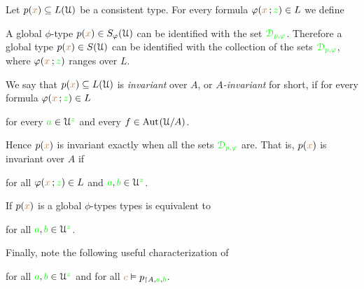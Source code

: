 Let $p({\color{brown} x})\subseteq L(\EuScript U)$ be a consistent type.
For every formula $\varphi({\color{brown} x}\,;{\color{green} z})\in L$ we define



A global $\phi$-type $p({\color{brown} x})\in S_\varphi(\EuScript U)$ can be identified with the set ${\color{green}\EuScript D_{p,\varphi}}$.
Therefore a global type $p({\color{brown} x})\in S(\EuScript U)$ can be identified with the collection of the sets ${\color{green}\EuScript D_{p,\varphi}}$, where $\varphi({\color{brown} x}\,;{\color{green} z})$ ranges over $L$.

We say that $p({\color{brown} x})\subseteq L(\EuScript U)$ is \emph{invariant\/} over $A$, or \emph{$A$-invariant\/} for short, if for every formula $\varphi({\color{brown} x}\,;{\color{green} z})\in L$ 

\hfill for every ${\color{green} a}\in\EuScript U^{\color{green} z}$ and every $f\in{\rm Aut\kern.15ex}(\EuScript U/A)$.

Hence $p({\color{brown} x})$ is invariant exactly when all the sets $\color{green}\EuScript D_{p,\varphi}$ are.
That is, $p({\color{brown} x})$ is invariant over $A$ if 

\hfill for all $\varphi({\color{brown} x}\,;{\color{green} z})\in L$ and ${\color{green} a},{\color{green} b}\in\EuScript U^{\color{green} z}$.


If $p({\color{brown} x})$ is a global $\phi$-types types  is equivalent to

\hfill for all ${\color{green} a},{\color{green} b}\in\EuScript U^{\color{green} z}$.

Finally, note the following useful characterization of 

\hfill for all ${\color{green} a},{\color{green} b}\in\EuScript U^{\color{green} z}$ and for all ${\color{brown} c}\vDash p_{\restriction A,{\color{green} a},{\color{green} b}}$.

